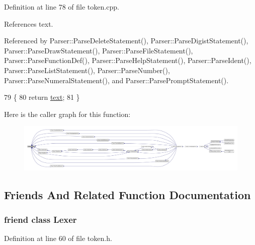 Definition at line 78 of file token.\+cpp.



References text.



Referenced by Parser\+::\+Parse\+Delete\+Statement(), Parser\+::\+Parse\+Digist\+Statement(), Parser\+::\+Parse\+Draw\+Statement(), Parser\+::\+Parse\+File\+Statement(), Parser\+::\+Parse\+Function\+Def(), Parser\+::\+Parse\+Help\+Statement(), Parser\+::\+Parse\+Ident(), Parser\+::\+Parse\+List\+Statement(), Parser\+::\+Parse\+Number(), Parser\+::\+Parse\+Numeral\+Statement(), and Parser\+::\+Parse\+Prompt\+Statement().


\begin{DoxyCode}
79 \{
80     \textcolor{keywordflow}{return} \hyperlink{structToken_ab2d6b41ba04b1a1e272d7e963303f8db}{text};
81 \}
\end{DoxyCode}


Here is the caller graph for this function\+:\nopagebreak
\begin{figure}[H]
\begin{center}
\leavevmode
\includegraphics[width=350pt]{structToken_a15f1043de07ce8e452fbf115b85def71_icgraph}
\end{center}
\end{figure}




\subsection{Friends And Related Function Documentation}
\subsubsection[{\texorpdfstring{Lexer}{Lexer}}]{\setlength{\rightskip}{0pt plus 5cm}friend class {\bf Lexer}\hspace{0.3cm}{\ttfamily [friend]}}\hypertarget{structToken_a2e54c4809acbcd06c4bd4f186ad91584}{}\label{structToken_a2e54c4809acbcd06c4bd4f186ad91584}


Definition at line 60 of file token.\+h.



